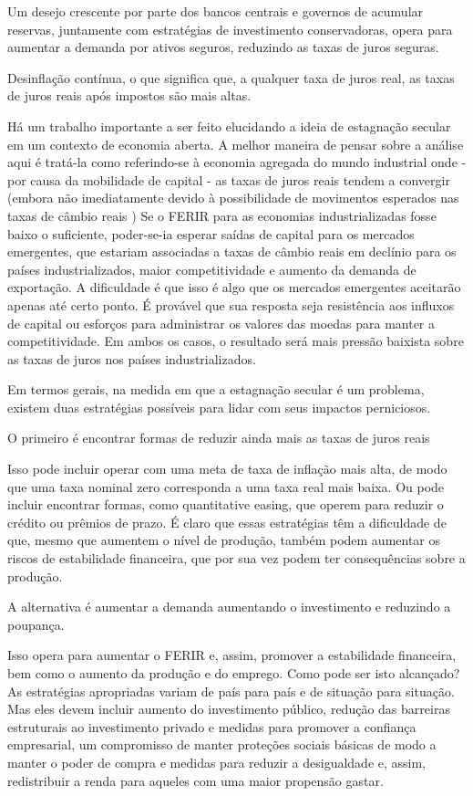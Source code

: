 Um desejo crescente por parte dos bancos centrais e governos de acumular reservas, juntamente com estratégias de investimento conservadoras, opera para aumentar a demanda por ativos seguros, reduzindo as taxas de juros seguras.

Desinflação contínua, o que significa que, a qualquer taxa de juros real, as taxas de juros reais após impostos são mais altas.

Há um trabalho importante a ser feito elucidando a ideia de estagnação secular em um contexto de economia aberta. A melhor maneira de pensar sobre a análise aqui é tratá-la como referindo-se à economia agregada do mundo industrial onde - por causa da mobilidade de capital - as taxas de juros reais tendem a convergir (embora não imediatamente devido à possibilidade de movimentos esperados nas taxas de câmbio reais ) Se o FERIR para as economias industrializadas fosse baixo o suficiente, poder-se-ia esperar saídas de capital para os mercados emergentes, que estariam associadas a taxas de câmbio reais em declínio para os países industrializados, maior competitividade e aumento da demanda de exportação. A dificuldade é que isso é algo que os mercados emergentes aceitarão apenas até certo ponto. É provável que sua resposta seja resistência aos influxos de capital ou esforços para administrar os valores das moedas para manter a competitividade. Em ambos os casos, o resultado será mais pressão baixista sobre as taxas de juros nos países industrializados.

Em termos gerais, na medida em que a estagnação secular é um problema, existem duas estratégias possíveis para lidar com seus impactos perniciosos.

O primeiro é encontrar formas de reduzir ainda mais as taxas de juros reais

Isso pode incluir operar com uma meta de taxa de inflação mais alta, de modo que uma taxa nominal zero corresponda a uma taxa real mais baixa. Ou pode incluir encontrar formas, como quantitative easing, que operem para reduzir o crédito ou prêmios de prazo. É claro que essas estratégias têm a dificuldade de que, mesmo que aumentem o nível de produção, também podem aumentar os riscos de estabilidade financeira, que por sua vez podem ter consequências sobre a produção.

A alternativa é aumentar a demanda aumentando o investimento e reduzindo a poupança.

Isso opera para aumentar o FERIR e, assim, promover a estabilidade financeira, bem como o aumento da produção e do emprego. Como pode ser isto alcançado? As estratégias apropriadas variam de país para país e de situação para situação. Mas eles devem incluir aumento do investimento público, redução das barreiras estruturais ao investimento privado e medidas para promover a confiança empresarial, um compromisso de manter proteções sociais básicas de modo a manter o poder de compra e medidas para reduzir a desigualdade e, assim, redistribuir a renda para aqueles com uma maior propensão gastar.
%
%
